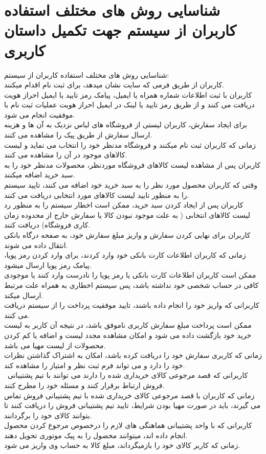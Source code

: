 \documentclass[12pt]{report}
\begin{document}
\section{ شناسایی روش های مختلف استفاده کاربران از سیستم جهت تکمیل داستان کاربری}
شناسایی روش های مختلف استفاده کاربران از سیستم:\\
کاربران از طریق فرمی که سایت نشان میدهد، برای ثبت نام اقدام میکنند.\\
کاربران با ثبت اطلاعات شماره همراه یا ایمیل، پیامک رمز تایید یا ایمیل احراز هویت دریافت می کنند و از طریق رمز تایید یا لینک در ایمیل احراز هویت عملیات ثبت نام با موفقیت انجام می شود.\\
برای ایجاد سفارش، کاربران لیستی از فروشگاه های لباس نزدیک به آن ها و هزینه ارسال سفارش از طریق پیک را مشاهده می کنند.\\
زمانی که کاربران ثبت نام میکنند و فروشگاه مدنظر خود را انتخاب می نماید و لیست کالاهای موجود در آن را مشاهده می کنند. \\
کاربران پس از مشاهده لیست کالاهای فروشگاه موردنظر، محصولات مدنظر خود را به سبد خرید اضافه میکنند.\\
وقتی که کاربران محصول مورد نظر را به سبد خرید خود اضافه می کنند، تایید سیستم را به منظور تایید لیست کالاهای مورد انتخابی دریافت می کنند.\\
کاربران پس از ایجاد کردن سبد خرید، ممکن است اخطار سیستم را به منظور رد لیست کالاهای انتخابی ( به علت موجود نبودن کالا یا سفارش خارج از محدوده زمان کاری فروشگاه) دریافت کنند.\\
کاربران برای نهایی کردن سفارش و واریز مبلغ سفارش خود، به صفحه درگاه بانکی انتقال داده می شوند.\\
زمانی که کاربران اطلاعات کارت بانکی خود وارد کردند، برای وارد کردن رمز پویا، پیامک رمز پویا ارسال میشود.\\
ممکن است کاربران اطلاعات کارت بانکی یا رمز پویا را نادرست وارد کنند یا موجودی کافی در حساب شخصی خود نداشته باشد، پس سیستم اخطاری به همراه علت مرتبط ارسال میکند.\\
کاربرانی که واریز خود را انجام داده باشند، تایید موفقیت پرداخت را از سیستم دریافت می کنند.\\
ممکن است پرداخت مبلغ سفارش کاربری ناموفق باشد، در نتیجه آن کاربر به لیست خرید خود بازگشت داده می شود و امکان مشاهده مجدد لیست و اضافه یا کم کردن محصولات از لیست مهیا می باشد.\\
زمانی که کاربری سفارش خود را دریافت کرده باشد، امکان به اشتراک گذاشتن نظرات خود را دارد و می تواند فرم ثبت نظر و امتیاز را مشاهده کند.\\\
کاربرانی که قصد مرجوعی کالای خریداری شده را دارند می توانند با تیم پشتیبانی فروش ارتباط برقرار کنند و مسئله خود را مطرح کنند.\\
زمانی که کاربران با قصد مرجوعی کالای خریداری شده با تیم پشتیبانی فروش تماس می گیرند، باید در صورت مهیا بودن شرایط، تایید تیم پشتیبانی فروش را دریافت کنند تا بتوانند کالای خود را برگردانند.\\
کاربرانی که با واحد پشتیبانی هماهنگی های لازم را درخصوص مرجوع کردن محصول انجام داده اند، میتوانند محصول را به پیک موتوری تحویل دهند.\\
زمانی که کاربر کالای خود را بازمیگرداند، مبلغ کالا به حساب وی واریز می شود.\\
\end{document}
